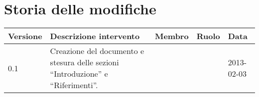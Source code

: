 \newcommand{\docName}{Definizione di prodotto}
\newcommand{\docFileName}{definizione\_di\_prodotto.1.0.pdf}
\newcommand{\docVers}{1.0}
\newcommand{\creationDate}{2013-02-03}
\newcommand{\modificationDate}{2013-02-03}
\newcommand{\docState}{Non approvato}
\newcommand{\docUsage}{Esterno}
\newcommand{\docDistributionList}{Prof. Tullio Vardanega\\&Prof. Riccardo Cardin\\&Dott. Gregorio Piccoli\\&Team SoftwareSynthesis}
\newcommand{\docAuthors}{Elena Zecchinato\\&Andrea Meneghinello\\&Riccardo Tresoldi}
\newcommand{\approvedBy}{Andrea Rizzi}
\newcommand{\verifiedBy}{Stefano Farronato\\&Marco Schivo}
\newcommand{\docRoot}{..}
\def\INDICETABELLE{false}
\def\INDICEFIGURE{false}









\section*{Storia delle modifiche}
\begin{center}
\begin{longtable}{lp{}lll}
\toprule
Versione & Descrizione intervento & Membro & Ruolo & Data\\
\midrule %
0.1 & Creazione del documento e stesura delle sezioni ``Introduzione'' e ``Riferimenti''. & &  & 2013-02-03\\
\bottomrule
\end{longtable}
\end{center}
\newpage

